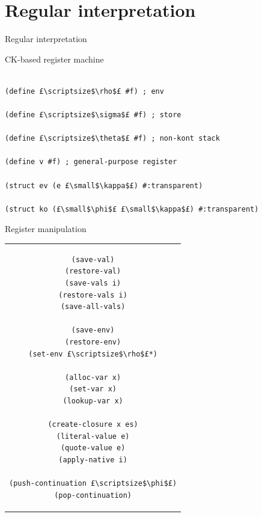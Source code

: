 \documentclass{beamer}
\begin{document}
\section{Regular interpretation}

\begin{frame}
\centering
\Huge{Regular interpretation}
\end{frame}

\begin{frame}[fragile]{CK-based register machine}

\begin{lstlisting}[basicstyle = \scriptsize\ttfamily, escapechar = £]

(define £\scriptsize$\rho$£ #f) ; env
  
(define £\scriptsize$\sigma$£ #f) ; store
  
(define £\scriptsize$\theta$£ #f) ; non-kont stack
  
(define v #f) ; general-purpose register

(struct ev (e £\small$\kappa$£) #:transparent)
  
(struct ko (£\small$\phi$£ £\small$\kappa$£) #:transparent)
\end{lstlisting}

\end{frame}

\begin{frame}[fragile]{Register manipulation}

\begin{center}
\begin{tabular}{c}
\begin{lstlisting}[basicstyle = \scriptsize\ttfamily, escapechar = £]
(save-val)
(restore-val)
(save-vals i)
(restore-vals i)
(save-all-vals)

(save-env)
(restore-env)
(set-env £\scriptsize$\rho$£*)

(alloc-var x)
(set-var x)
(lookup-var x)

(create-closure x es)
(literal-value e)
(quote-value e)
(apply-native i)

(push-continuation £\scriptsize$\phi$£)
(pop-continuation)
\end{lstlisting}
\end{tabular}
\end{center}

\end{frame}
\end{document}
